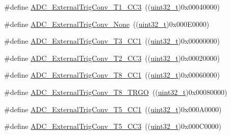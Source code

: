 \begin{DoxyCompactItemize}
\item 
\#define \hyperlink{group___a_d_c__external__trigger__sources__for__regular__channels__conversion_ga41ad03e2921f6de0fb75ae06d6046e63}{A\+D\+C\+\_\+\+External\+Trig\+Conv\+\_\+\+T1\+\_\+\+C\+C3}~((\hyperlink{_p_e___types_8h_a33594304e786b158f3fb30289278f5af}{uint32\+\_\+t})0x00040000)
\item 
\#define \hyperlink{group___a_d_c__external__trigger__sources__for__regular__channels__conversion_ga433a3845ed1792fa6359b763c955e9c2}{A\+D\+C\+\_\+\+External\+Trig\+Conv\+\_\+\+None}~((\hyperlink{_p_e___types_8h_a33594304e786b158f3fb30289278f5af}{uint32\+\_\+t})0x000\+E0000)
\item 
\#define \hyperlink{group___a_d_c__external__trigger__sources__for__regular__channels__conversion_ga3c73d5c8bb0f898dbbc74bcc536f6ec1}{A\+D\+C\+\_\+\+External\+Trig\+Conv\+\_\+\+T3\+\_\+\+C\+C1}~((\hyperlink{_p_e___types_8h_a33594304e786b158f3fb30289278f5af}{uint32\+\_\+t})0x00000000)
\item 
\#define \hyperlink{group___a_d_c__external__trigger__sources__for__regular__channels__conversion_ga16ae1b335f2c2b4facf3d4bedc2ce27f}{A\+D\+C\+\_\+\+External\+Trig\+Conv\+\_\+\+T2\+\_\+\+C\+C3}~((\hyperlink{_p_e___types_8h_a33594304e786b158f3fb30289278f5af}{uint32\+\_\+t})0x00020000)
\item 
\#define \hyperlink{group___a_d_c__external__trigger__sources__for__regular__channels__conversion_ga97af875d12e77a67e84f3aaf1f8033ed}{A\+D\+C\+\_\+\+External\+Trig\+Conv\+\_\+\+T8\+\_\+\+C\+C1}~((\hyperlink{_p_e___types_8h_a33594304e786b158f3fb30289278f5af}{uint32\+\_\+t})0x00060000)
\item 
\#define \hyperlink{group___a_d_c__external__trigger__sources__for__regular__channels__conversion_gab26d94590d47ae6ec46841652741abf3}{A\+D\+C\+\_\+\+External\+Trig\+Conv\+\_\+\+T8\+\_\+\+T\+R\+GO}~((\hyperlink{_p_e___types_8h_a33594304e786b158f3fb30289278f5af}{uint32\+\_\+t})0x00080000)
\item 
\#define \hyperlink{group___a_d_c__external__trigger__sources__for__regular__channels__conversion_ga6bd1ad69cb455afeabf6759b640378d3}{A\+D\+C\+\_\+\+External\+Trig\+Conv\+\_\+\+T5\+\_\+\+C\+C1}~((\hyperlink{_p_e___types_8h_a33594304e786b158f3fb30289278f5af}{uint32\+\_\+t})0x000\+A0000)
\item 
\#define \hyperlink{group___a_d_c__external__trigger__sources__for__regular__channels__conversion_ga95b58981aff35d6d5fa229925cd6315d}{A\+D\+C\+\_\+\+External\+Trig\+Conv\+\_\+\+T5\+\_\+\+C\+C3}~((\hyperlink{_p_e___types_8h_a33594304e786b158f3fb30289278f5af}{uint32\+\_\+t})0x000\+C0000)

\end{DoxyCompactItemize}
